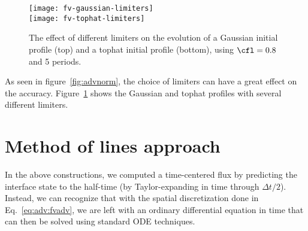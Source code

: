 \begin{figure}[ht]
\centering
\texttt{[image: fv-gaussian-limiters]} \\[1em]
\texttt{[image: fv-tophat-limiters]}
\caption[Effect of different limiters on evolution]
        {\label{fig:limiter_panel} The effect of different limiters on the
          evolution of a Gaussian initial profile (top) and a tophat initial
          profile (bottom), using $\cfl = 0.8$ and 5 periods. \\
        }
\end{figure}

As seen in figure~\ref{fig:advnorm}, the choice of limiters can have a great
effect on the accuracy.  Figure~\ref{fig:limiter_panel} shows the Gaussian and
tophat profiles with several different limiters.

\section{Method of lines approach}
\label{adv:sec:mol_2d}

In the above constructions, we computed a time-centered flux by
predicting the interface state to the half-time (by Taylor-expanding
in time through $\Delta t /2$).  Instead, we can recognize that with
the spatial discretization done in Eq.~\ref{eq:adv:fvadv}, we are left
with an ordinary differential equation in time that can then be solved
using standard ODE techniques.

